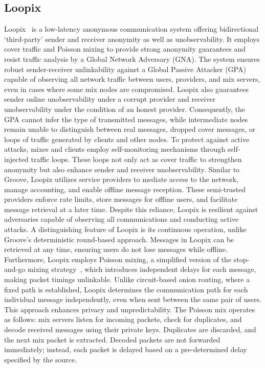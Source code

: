 \subsection{Loopix}\label{subsec:loopix}
Loopix~\cite{Loopix} is a low-latency anonymous communication system offering bidirectional `third-party' sender and receiver anonymity as well as unobservability. It employs cover traffic and Poisson mixing to provide strong anonymity guarantees and resist traffic analysis by a Global Network Adversary (GNA).
The system ensures robust sender-receiver unlinkability against a Global Passive Attacker (GPA) capable of observing all network traffic between users, providers, and mix servers, even in cases where some mix nodes are compromised. Loopix also guarantees sender online unobservability under a corrupt provider and receiver unobservability under the condition of an honest provider. Consequently, the GPA cannot infer the type of transmitted messages, while intermediate nodes remain unable to distinguish between real messages, dropped cover messages, or loops of traffic generated by clients and other nodes.
To protect against active attacks, mixes and clients employ self-monitoring mechanisms through self-injected traffic loops. These loops not only act as cover traffic to strengthen anonymity but also enhance sender and receiver unobservability.
Similar to Groove, Loopix utilizes service providers to mediate access to the network, manage accounting, and enable offline message reception. These semi-trusted providers enforce rate limits, store messages for offline users, and facilitate message retrieval at a later time. Despite this reliance, Loopix is resilient against adversaries capable of observing all communications and conducting active attacks.
A distinguishing feature of Loopix is its continuous operation, unlike Groove's deterministic round-based approach. Messages in Loopix can be retrieved at any time, ensuring users do not lose messages while offline. Furthermore, Loopix employs Poisson mixing, a simplified version of the stop-and-go mixing strategy~\cite{StopAndGoMixing}, which introduces independent delays for each message, making packet timings unlinkable.
Unlike circuit-based onion routing, where a fixed path is established, Loopix determines the communication path for each individual message independently, even when sent between the same pair of users. This approach enhances privacy and unpredictability.
The Poisson mix operates as follows: mix servers listen for incoming packets, check for duplicates, and decode received messages using their private keys. Duplicates are discarded, and the next mix packet is extracted. Decoded packets are not forwarded immediately; instead, each packet is delayed based on a pre-determined delay specified by the source.

